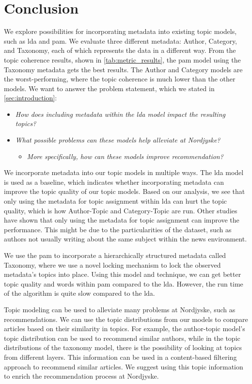 \section{Conclusion}\label{sec:conclusion}
We explore possibilities for incorporating metadata into existing topic models, such as \gls{lda} and \gls{pam}.
We evaluate three different metadata: Author, Category, and Taxonomy, each of which represents the data in a different way.
From the topic coherence results, shown in \autoref{tab:metric_results}, the \gls{pam} model using the Taxonomy metadata gets the best results.
The Author and Category models are the worst-performing, where the topic coherence is much lower than the other models.
We want to answer the problem statement, which we stated in \autoref{sec:introduction}:


\begin{itemize}
	\item \textit{How does including metadata within the \gls{lda} model impact the resulting topics?}
	\item \textit{What possible problems can these models help alleviate at Nordjyske?}
	\begin{itemize}
		\item \textit{More specifically, how can these models improve recommendation?}
	\end{itemize}
\end{itemize}

We incorporate metadata into our topic models in multiple ways.
The \gls{lda} model is used as a baseline, which indicates whether incorporating metadata can improve the topic quality of our topic models.
Based on our analysis, we see that only using the metadata for topic assignment within \gls{lda} can hurt the topic quality, which is how Author-Topic and Category-Topic are run.
Other studies have shown that only using the metadata for topic assignment can improve the performance.
This might be due to the particularities of the dataset, such as authors not usually writing about the same subject within the news environment.  


We use the \gls{pam} to incorporate a hierarchically structured metadata called Taxonomy, where we use a novel locking mechanism to lock the observed metadata's topics into place.
Using this model and technique, we can get better topic quality and words within \gls{pam} compared to the \gls{lda}.
However, the run time of the algorithm is quite slow compared to the \gls{lda}.


Topic modeling can be used to alleviate many problems at Nordjyske, such as recommendations.
We can use the topic distributions from our models to compare articles based on their similarity in topics.
For example, the author-topic model's topic distribution can be used to recommend similar authors, while in the topic distributions of the taxonomy model, there is the possibility of looking at topics from different layers.
This information can be used in a content-based filtering approach to recommend similar articles.
We suggest using this topic information to enrich the recommendation process at Nordjyske. 
